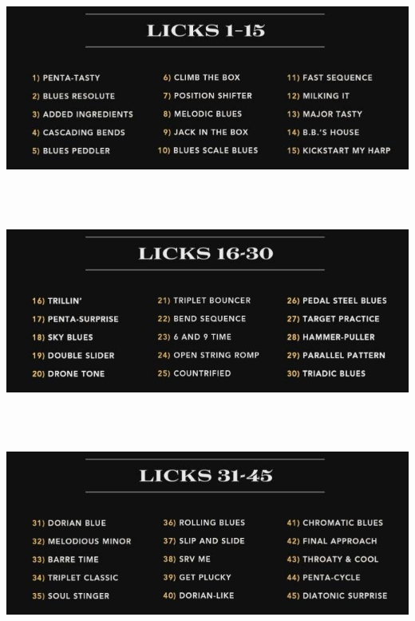 \documentclass[a4paper]{book}
\begin{document}
\begin{center}
\includegraphics[width=17cm,height=6.881cm]{lebluessupportsmethodes-img16.jpg}
\end{center}
\begin{center}
\includegraphics[width=17cm,height=6.881cm]{lebluessupportsmethodes-img17.jpg}
\end{center}


\begin{center}
\includegraphics[width=17cm,height=6.881cm]{lebluessupportsmethodes-img18.jpg}
\end{center}
\end{document}
